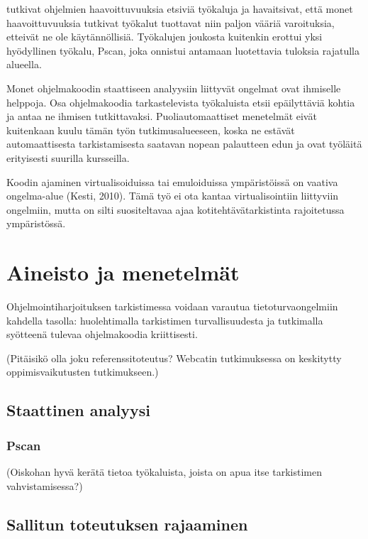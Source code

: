 \cite{heffleymeunier2004} tutkivat ohjelmien haavoittuvuuksia etsiviä työkaluja
ja havaitsivat, että monet haavoittuvuuksia tutkivat työkalut tuottavat niin
paljon vääriä varoituksia, etteivät ne ole käytännöllisiä. Työkalujen joukosta
kuitenkin erottui yksi hyödyllinen työkalu, Pscan, joka onnistui antamaan
luotettavia tuloksia rajatulla alueella. 

Monet ohjelmakoodin staattiseen analyysiin liittyvät ongelmat ovat ihmiselle
helppoja. Osa ohjelmakoodia tarkastelevista työkaluista etsii epäilyttäviä
kohtia ja antaa ne ihmisen tutkittavaksi. \citep{taft2008} Puoliautomaattiset
menetelmät eivät kuitenkaan kuulu tämän työn tutkimusalueeseen, koska ne
estävät automaattisesta tarkistamisesta saatavan nopean palautteen edun ja
ovat työläitä erityisesti suurilla kursseilla.

Koodin ajaminen virtualisoiduissa tai emuloiduissa ympäristöissä on vaativa
ongelma-alue (Kesti, 2010). Tämä työ ei ota kantaa virtualisointiin
liittyviin ongelmiin, mutta on silti suositeltavaa ajaa kotitehtävätarkistinta
rajoitetussa ympäristössä.


\section{Aineisto ja menetelmät}
\label{sec:aineisto}

Ohjelmointiharjoituksen tarkistimessa voidaan varautua tietoturvaongelmiin
kahdella tasolla: huolehtimalla tarkistimen turvallisuudesta ja tutkimalla
syötteenä tulevaa ohjelmakoodia kriittisesti.

(Pitäisikö olla joku referenssitoteutus? Webcatin tutkimuksessa on keskitytty
oppimisvaikutusten tutkimukseen.)

\subsection{Staattinen analyysi}


\subsubsection{Pscan}

(Oiskohan hyvä kerätä tietoa työkaluista, joista on apua itse tarkistimen
vahvistamisessa?)

\subsection{Sallitun toteutuksen rajaaminen}

